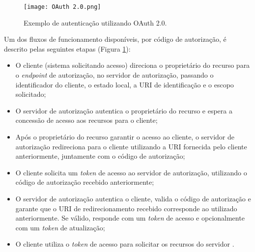 \begin{figure}[ht]
    \centering
    \texttt{[image: OAuth 2.0.png]}
    \caption{Exemplo de autenticação utilizando OAuth 2.0.}
    \label{fig:OAuth2}
\end{figure}

Um dos fluxos de funcionamento 
disponíveis, por código de autorização, é descrito pelas seguintes etapas (Figura \ref{fig:OAuth2}):

\begin{itemize}
\item O cliente (sistema solicitando acesso) direciona o proprietário do recurso para o \emph{endpoint} de autorização, no servidor
de autorização, passando o identificador do cliente, o estado local, a URI de identificação e o 
escopo solicitado;
\item O servidor de autorização autentica o proprietário do recurso e espera a concessão de acesso 
aos recursos para o cliente;
\item Após o proprietário do recurso garantir o acesso ao cliente, o servidor de autorização 
redireciona para o cliente utilizando a URI fornecida pelo cliente anteriormente, juntamente com o 
código de autorização;
\item O cliente solicita um \emph{token} de acesso ao servidor de autorização, utilizando o código
de autorização recebido anteriormente;
\item O servidor de autorização autentica o cliente, valida o código de autorização e garante que o 
URI de redirecionamento recebido corresponde ao utilizado anteriormente. Se válido, responde com um 
\emph{token} de acesso e opcionalmente com um \emph{token} de atualização;
\item O cliente utiliza o \emph{token} de acesso para solicitar os recursos do servidor \cite{RFC6749}.
\end{itemize}
